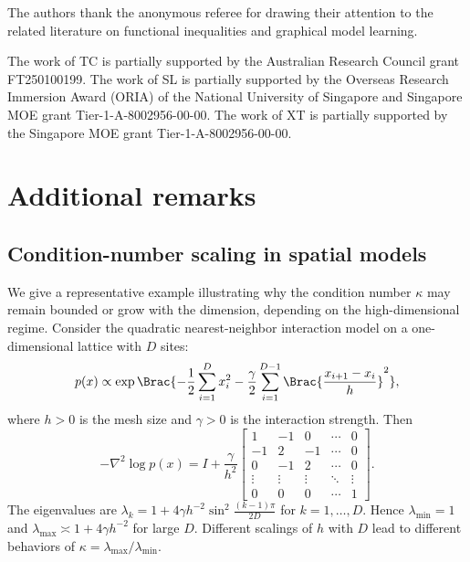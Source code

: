 \documentclass[11pt]{article}
\begin{document}
The authors thank the anonymous referee for drawing their attention to the related literature on functional inequalities and graphical model learning.

The work of TC is partially supported by the Australian Research Council grant FT250100199. The work of SL is partially supported by the Overseas Research Immersion Award (ORIA) of the National University of Singapore and Singapore MOE grant Tier-1-A-8002956-00-00. 
The work of XT is partially supported by the Singapore MOE grant Tier-1-A-8002956-00-00.


\appendix

\renewcommand{\thesection}{S\arabic{section}}
\renewcommand{\thesubsection}{\thesection.\arabic{subsection}}
\renewcommand{\thesubsubsection}{\thesubsection.\arabic{subsubsection}}

\section{Additional remarks}
\label{app:add_remarks}

\subsection{Condition-number scaling in spatial models}
\label{app:cond_scaling}

We give a representative example illustrating why the condition number $\kappa$ may remain bounded or grow with the dimension, depending on the high-dimensional regime.
Consider the quadratic nearest-neighbor interaction model on a one-dimensional lattice with $D$ sites:
\begin{equation}
    p(x) \propto \exp \Brac{ - \frac{1}{2} \sum_{i=1}^D x_i^2 - \frac{\gamma}{2} \sum_{i=1}^{D-1} \Brac{ \frac{x_{i+1}-x_i}{h} }^2 },
\end{equation}
where $h>0$ is the mesh size and $\gamma>0$ is the interaction strength.
Then
\begin{equation}
    - \nabla^2 \log p(x)
    =
    I + \frac{\gamma}{h^2}
    \begin{bmatrix}
        1 & -1 & 0 & \cdots & 0 \\
        -1 & 2 & -1 & \cdots & 0 \\
        0 & -1 & 2 & \cdots & 0 \\
        \vdots & \vdots & \vdots & \ddots & \vdots \\
        0 & 0 & 0 & \cdots & 1
    \end{bmatrix}.
\end{equation}
The eigenvalues are
\(
    \lambda_k = 1 + 4\gamma h^{-2} \sin^2 \frac{(k-1)\pi}{2D}
\)
for $k=1,\ldots,D$.
Hence $\lambda_{\min}=1$ and $\lambda_{\max}\asymp 1+4\gamma h^{-2}$ for large $D$.
Different scalings of $h$ with $D$ lead to different behaviors of $\kappa=\lambda_{\max}/\lambda_{\min}$.
\end{document}
